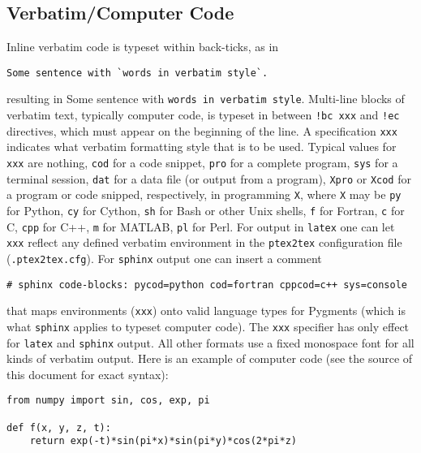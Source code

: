 \documentclass[%
oneside,                 %
final,                   %
10pt]{article}
\begin{document}
\subsection{Verbatim/Computer Code}
Inline verbatim code is typeset within back-ticks, as in
\begin{Verbatim}[numbers=none,fontsize=\fontsize{9pt}{9pt},baselinestretch=0.95,xleftmargin=2mm]
Some sentence with `words in verbatim style`.

\end{Verbatim}

resulting in Some sentence with \texttt{words in verbatim style}.
Multi-line blocks of verbatim text, typically computer code, is typeset
in between \Verb?!bc xxx? and \Verb?!ec? directives, which must appear on the
beginning of the line. A specification \texttt{xxx} indicates what verbatim
formatting style that is to be used. Typical values for \texttt{xxx} are
nothing, \texttt{cod} for a code snippet, \texttt{pro} for a complete program,
\texttt{sys} for a terminal session, \texttt{dat} for a data file (or output from a
program),
\texttt{Xpro} or \texttt{Xcod} for a program or code snipped, respectively,
in programming \texttt{X}, where \texttt{X} may be \texttt{py} for Python,
\texttt{cy} for Cython, \texttt{sh} for Bash or other Unix shells,
\texttt{f} for Fortran, \texttt{c} for C, \texttt{cpp} for C++, \texttt{m} for MATLAB,
\texttt{pl} for Perl. For output in \texttt{latex} one can let \texttt{xxx} reflect any
defined verbatim environment in the \texttt{ptex2tex} configuration file
(\texttt{.ptex2tex.cfg}). For \texttt{sphinx} output one can insert a comment
\begin{Verbatim}[numbers=none,fontsize=\fontsize{9pt}{9pt},baselinestretch=0.95,xleftmargin=2mm]
# sphinx code-blocks: pycod=python cod=fortran cppcod=c++ sys=console

\end{Verbatim}

that maps environments (\texttt{xxx}) onto valid language types for
Pygments (which is what \texttt{sphinx} applies to typeset computer code).
The \texttt{xxx} specifier has only effect for \texttt{latex} and
\texttt{sphinx} output. All other formats use a fixed monospace font for all
kinds of verbatim output.
Here is an example of computer code (see the source of this document
for exact syntax):
\begin{Verbatim}[numbers=none,fontsize=\fontsize{9pt}{9pt},baselinestretch=0.95,xleftmargin=2mm]
from numpy import sin, cos, exp, pi

def f(x, y, z, t):
    return exp(-t)*sin(pi*x)*sin(pi*y)*cos(2*pi*z)

\end{Verbatim}
\end{document}
